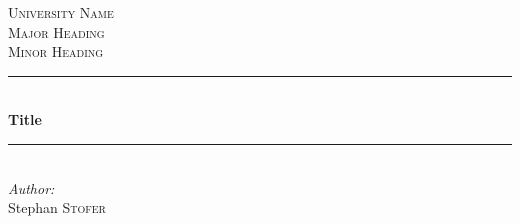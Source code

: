 \begin{titlepage}

\newcommand{\HRule}{\rule{\linewidth}{0.5mm}} %

\center %
 

\textsc{\LARGE University Name}\\[1.5cm] %
\textsc{\Large Major Heading}\\[0.5cm] %
\textsc{\large Minor Heading}\\[0.5cm] %


\HRule \\[0.4cm]
{ \huge \bfseries Title}\\[0.4cm] %
\HRule \\[1.5cm]
 


\Large \emph{Author:}\\
Stephan \textsc{Stofer}\\[3cm] %


\end{titlepage}
